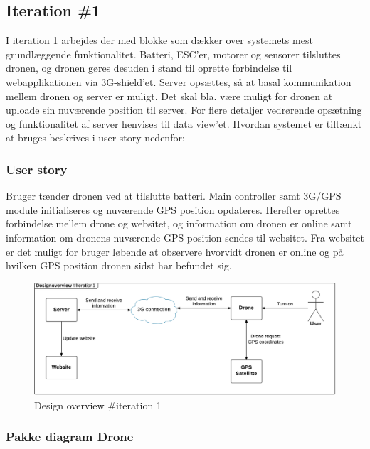 \subsection{Iteration \#1}
I iteration 1 arbejdes der med blokke som dækker over systemets mest grundlæggende funktionalitet. Batteri, ESC’er, motorer og sensorer tilsluttes dronen, og dronen gøres desuden i stand til oprette forbindelse til webapplikationen via 3G-shield’et.
Server opsættes, så at basal kommunikation mellem dronen og server er muligt. Det skal bla. være muligt for dronen at uploade sin nuværende position til server. For flere detaljer vedrørende opsætning og funktionalitet af server henvises til data view'et. 
Hvordan systemet er tiltænkt at bruges beskrives i user story nedenfor:

\subsubsection*{User story}
Bruger tænder dronen ved at tilslutte batteri. Main controller samt 3G/GPS module initialiseres og nuværende GPS position opdateres. Herefter oprettes forbindelse mellem drone og websitet, og information om dronen er online samt information om dronens nuværende GPS position sendes til websitet. Fra websitet er det muligt for bruger løbende at observere hvorvidt dronen er online og på hvilken GPS position dronen sidst har befundet sig.

\begin{figure}[H]
	\centering
	\includegraphics[width=1\textwidth]{Billeder/design_overview/design_overview_iteration1.png}
	\vspace{-.5cm}
	\caption{Design overview \#iteration 1}
	\label{fig:design_overview_UC1}
\end{figure}


\newpage
\subsubsection*{Pakke diagram Drone}

